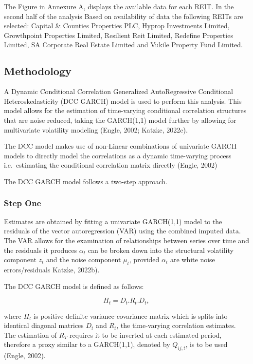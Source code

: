 \documentclass[11pt,preprint, authoryear]{elsarticle}
\numberwithin{equation}{section}
\numberwithin{figure}{section}
\numberwithin{table}{section}
\begin{document}
The Figure in Annexure A, displays the available data for each REIT. In
the second half of the analysis Based on availability of data the
following REITs are selected: Capital \& Counties Properties PLC, Hyprop
Investments Limited, Growthpoint Properties Limited, Resilient Reit
Limited, Redefine Properties Limited, SA Corporate Real Estate Limited
and Vukile Property Fund Limited.

\hypertarget{methodology}{%
\subsection{Methodology}\label{methodology}}

A Dynamic Conditional Correlation Generalized AutoRegressive Conditional
Heteroskedasticity (DCC GARCH) model is used to perform this analysis.
This model allows for the estimation of time-varying conditional
correlation structures that are noise reduced, taking the GARCH(1,1)
model further by allowing for multivariate volatility modeling (Engle,
2002; Katzke, 2022c).

The DCC model makes use of non-Linear combinations of univariate GARCH
models to directly model the correlations as a dynamic time-varying
process i.e.~estimating the conditional correlation matrix directly
(Engle, 2002)

The DCC GARCH model follows a two-step approach.

\hypertarget{step-one}{%
\subsubsection{Step One}\label{step-one}}

Estimates are obtained by fitting a univariate GARCH(1,1) model to the
residuals of the vector autoregression (VAR) using the combined imputed
data. The VAR allows for the examination of relationships between series
over time and the residuals it produces \(\alpha_{t}\) can be broken
down into the structural volatility component \(z_{t}\) and the noise
component \(\mu_{t}\), provided \(\alpha_{t}\) are white noise
errors/residuals Katzke, 2022b).

The DCC GARCH model is defined as follows:

\[
H_{t}=D_{t}. R_{t}. D_{t},
\]

where \(H_{t}\) is positive definite variance-covariance matrix which is
splits into identical diagonal matrices \(D_{t}\) and \(R_{t}\), the
time-varying correlation estimates. The estimation of \(R_{T}\) requires
it to be inverted at each estimated period, therefore a proxy similar to
a GARCH(1,1), denoted by \(Q_{i j, t}\), is to be used (Engle, 2002).
\end{document}
